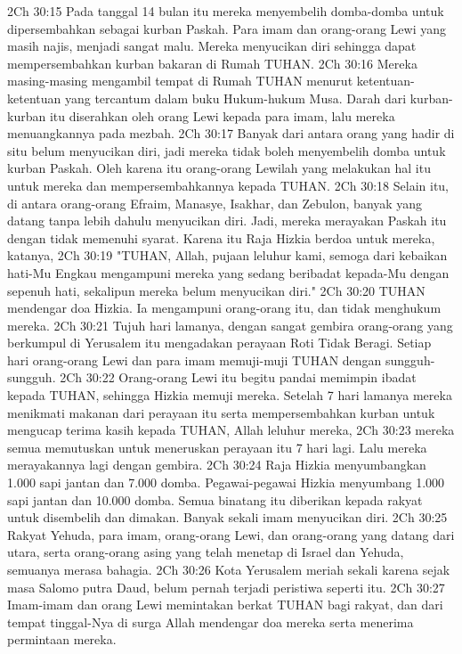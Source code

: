 2Ch 30:15  Pada tanggal 14 bulan itu mereka menyembelih domba-domba untuk dipersembahkan sebagai kurban Paskah. Para imam dan orang-orang Lewi yang masih najis, menjadi sangat malu. Mereka menyucikan diri sehingga dapat mempersembahkan kurban bakaran di Rumah TUHAN.
2Ch 30:16  Mereka masing-masing mengambil tempat di Rumah TUHAN menurut ketentuan-ketentuan yang tercantum dalam buku Hukum-hukum Musa. Darah dari kurban-kurban itu diserahkan oleh orang Lewi kepada para imam, lalu mereka menuangkannya pada mezbah.
2Ch 30:17  Banyak dari antara orang yang hadir di situ belum menyucikan diri, jadi mereka tidak boleh menyembelih domba untuk kurban Paskah. Oleh karena itu orang-orang Lewilah yang melakukan hal itu untuk mereka dan mempersembahkannya kepada TUHAN.
2Ch 30:18  Selain itu, di antara orang-orang Efraim, Manasye, Isakhar, dan Zebulon, banyak yang datang tanpa lebih dahulu menyucikan diri. Jadi, mereka merayakan Paskah itu dengan tidak memenuhi syarat. Karena itu Raja Hizkia berdoa untuk mereka, katanya,
2Ch 30:19  "TUHAN, Allah, pujaan leluhur kami, semoga dari kebaikan hati-Mu Engkau mengampuni mereka yang sedang beribadat kepada-Mu dengan sepenuh hati, sekalipun mereka belum menyucikan diri."
2Ch 30:20  TUHAN mendengar doa Hizkia. Ia mengampuni orang-orang itu, dan tidak menghukum mereka.
2Ch 30:21  Tujuh hari lamanya, dengan sangat gembira orang-orang yang berkumpul di Yerusalem itu mengadakan perayaan Roti Tidak Beragi. Setiap hari orang-orang Lewi dan para imam memuji-muji TUHAN dengan sungguh-sungguh.
2Ch 30:22  Orang-orang Lewi itu begitu pandai memimpin ibadat kepada TUHAN, sehingga Hizkia memuji mereka. Setelah 7 hari lamanya mereka menikmati makanan dari perayaan itu serta mempersembahkan kurban untuk mengucap terima kasih kepada TUHAN, Allah leluhur mereka,
2Ch 30:23  mereka semua memutuskan untuk meneruskan perayaan itu 7 hari lagi. Lalu mereka merayakannya lagi dengan gembira.
2Ch 30:24  Raja Hizkia menyumbangkan 1.000 sapi jantan dan 7.000 domba. Pegawai-pegawai Hizkia menyumbang 1.000 sapi jantan dan 10.000 domba. Semua binatang itu diberikan kepada rakyat untuk disembelih dan dimakan. Banyak sekali imam menyucikan diri.
2Ch 30:25  Rakyat Yehuda, para imam, orang-orang Lewi, dan orang-orang yang datang dari utara, serta orang-orang asing yang telah menetap di Israel dan Yehuda, semuanya merasa bahagia.
2Ch 30:26  Kota Yerusalem meriah sekali karena sejak masa Salomo putra Daud, belum pernah terjadi peristiwa seperti itu.
2Ch 30:27  Imam-imam dan orang Lewi memintakan berkat TUHAN bagi rakyat, dan dari tempat tinggal-Nya di surga Allah mendengar doa mereka serta menerima permintaan mereka.
